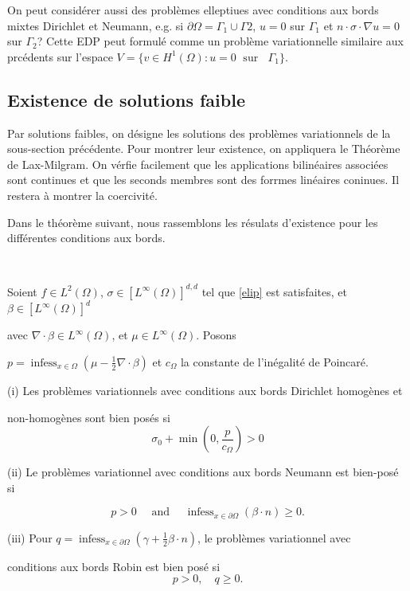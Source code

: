 \begin{remark}
	
	On peut considérer aussi  des problèmes elleptiues  avec conditions aux bords mixtes Dirichlet et Neumann, e.g.  si $\partial \Omega =\Gamma_1\cup \Gamma2$, $u=0$ sur $\Gamma_1$ et $n \cdot \sigma \cdot \nabla u=0$ sur  $\Gamma_2$? Cette EDP peut formulé comme un problème variationnelle similaire aux prcédents sur l'espace $V=\{v\in H^1(\Omega ):  u=0  \;  \text{ sur }  \; \;  \Gamma_1\}$. 
\end{remark} 
\subsection{Existence de solutions faible}

Par  solutions faibles, on désigne les solutions des problèmes variationnels de la sous-section précédente. Pour montrer leur  existence, on appliquera le Théorème de Lax-Milgram. On vérfie facilement que les applications bilinéaires associées sont continues et que les seconds membres sont des forrmes linéaires coninues. Il restera à montrer la coercivité.

Dans le théorème  suivant, nous rassemblons les résulats d'existence pour les différentes conditions aux bords.

\begin{theorem}\label{thm12}\
	
Soient $f \in L^{2}(\Omega)$,  $\sigma \in\left[L^{\infty}(\Omega)\right]^{d, d}$  tel que  \eqref{elip} est satisfaites, et  $\beta \in\left[L^{\infty}(\Omega)\right]^{d}$ 

avec  $\nabla \cdot \beta \in L^{\infty}(\Omega)$, et $\mu \in L^{\infty}(\Omega) .$ Posons 


$p=\operatorname{infess}_{x \in \Omega}\left(\mu-\frac{1}{2} \nabla \cdot \beta\right)$ et  $c_{\Omega}$ la constante de l'inégalité de  Poincaré.



(i) Les problèmes variationnels avec conditions aux bords  Dirichlet  homogènes  et  

non-homogènes sont bien posés si
$$
\sigma_{0}+\min \left(0, \frac{p}{c_{\Omega}}\right)>0
$$

(ii) Le problèmes variationnel avec conditions aux bords  Neumann est bien-posé  si

$$
p>0 \quad \text { and } \quad \operatorname{infess}_{x \in \partial \Omega}(\beta \cdot n) \geq 0.
$$

(iii) Pour $q=\operatorname{infess}_{x \in \partial \Omega}\left(\gamma+\frac{1}{2} \beta \cdot n\right)$,   le problèmes variationnel avec 

conditions aux bords  Robin est bien posé si
$$
p> 0, \quad q \geq 0.
$$

\end{theorem} 

